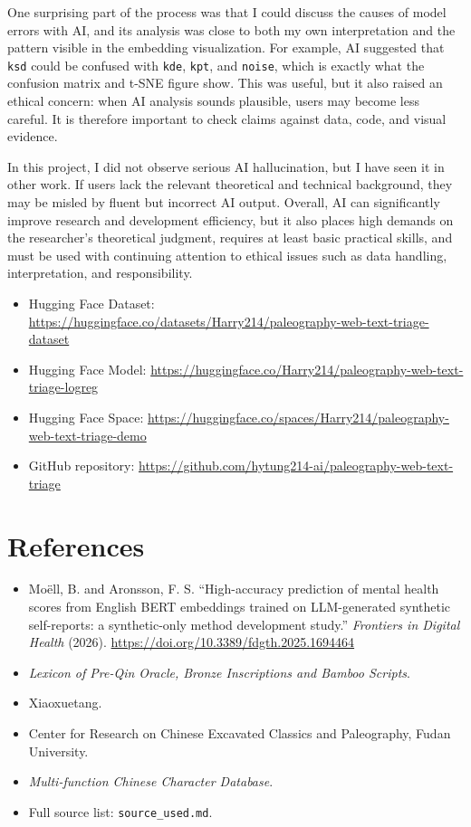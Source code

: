 \documentclass[11pt,a4paper]{article}
\begin{document}
One surprising part of the process was that I could discuss the causes of model errors with AI, and its analysis was close to both my own interpretation and the pattern visible in the embedding visualization. For example, AI suggested that \texttt{ksd} could be confused with \texttt{kde}, \texttt{kpt}, and \texttt{noise}, which is exactly what the confusion matrix and t-SNE figure show. This was useful, but it also raised an ethical concern: when AI analysis sounds plausible, users may become less careful. It is therefore important to check claims against data, code, and visual evidence.

In this project, I did not observe serious AI hallucination, but I have seen it in other work. If users lack the relevant theoretical and technical background, they may be misled by fluent but incorrect AI output. Overall, AI can significantly improve research and development efficiency, but it also places high demands on the researcher's theoretical judgment, requires at least basic practical skills, and must be used with continuing attention to ethical issues such as data handling, interpretation, and responsibility.

\begin{itemize}
  \item Hugging Face Dataset: \url{https://huggingface.co/datasets/Harry214/paleography-web-text-triage-dataset}
  \item Hugging Face Model: \url{https://huggingface.co/Harry214/paleography-web-text-triage-logreg}
  \item Hugging Face Space: \url{https://huggingface.co/spaces/Harry214/paleography-web-text-triage-demo}
  \item GitHub repository: \url{https://github.com/hytung214-ai/paleography-web-text-triage}
\end{itemize}

\section*{References}

\begin{itemize}
  \item Moëll, B. and Aronsson, F. S. ``High-accuracy prediction of mental health scores from English BERT embeddings trained on LLM-generated synthetic self-reports: a synthetic-only method development study.'' \textit{Frontiers in Digital Health} (2026). \url{https://doi.org/10.3389/fdgth.2025.1694464}
  \item \textit{Lexicon of Pre-Qin Oracle, Bronze Inscriptions and Bamboo Scripts}.
  \item Xiaoxuetang.
  \item Center for Research on Chinese Excavated Classics and Paleography, Fudan University.
  \item \textit{Multi-function Chinese Character Database}.
  \item Full source list: \texttt{source\_used.md}.
\end{itemize}
\end{document}
